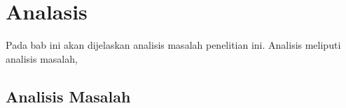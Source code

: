 \chapter{Analasis}
\label{chap:analisis}
Pada bab ini akan dijelaskan analisis masalah penelitian ini. Analisis meliputi analisis masalah,
\section{Analisis Masalah}
\section{}